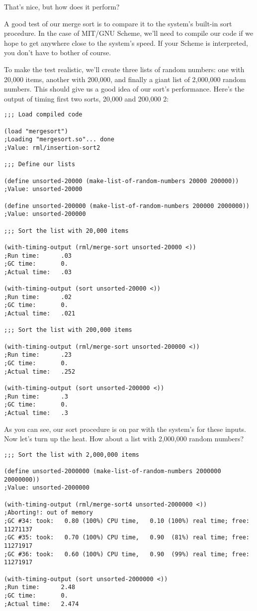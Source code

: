 \documentclass[12pt,openright,draft]{book}
\begin{document}
That's nice, but how does it perform?

A good test of our merge sort is to compare it to the system's
built-in sort procedure. In the case of MIT/GNU Scheme, we'll need to
compile our code if we hope to get anywhere close to the system's
speed. If your Scheme is interpreted, you don't have to bother of
course.

To make the test realistic, we'll create three lists of random
numbers: one with 20,000 items, another with 200,000, and finally a
giant list of 2,000,000 random numbers. This should give us a good
idea of our sort's performance. Here's the output of timing first two
sorts, 20,000 and 200,000 2:

\begin{verbatim}
;;; Load compiled code

(load "mergesort")
;Loading "mergesort.so"... done
;Value: rml/insertion-sort2

;;; Define our lists

(define unsorted-20000 (make-list-of-random-numbers 20000 200000))
;Value: unsorted-20000

(define unsorted-200000 (make-list-of-random-numbers 200000 2000000))
;Value: unsorted-200000

;;; Sort the list with 20,000 items

(with-timing-output (rml/merge-sort unsorted-20000 <))
;Run time:      .03
;GC time:       0.
;Actual time:   .03

(with-timing-output (sort unsorted-20000 <))
;Run time:      .02
;GC time:       0.
;Actual time:   .021

;;; Sort the list with 200,000 items

(with-timing-output (rml/merge-sort unsorted-200000 <))
;Run time:      .23
;GC time:       0.
;Actual time:   .252

(with-timing-output (sort unsorted-200000 <))
;Run time:      .3
;GC time:       0.
;Actual time:   .3
\end{verbatim}

As you can see, our sort procedure is on par with the system's for
these inputs. Now let's turn up the heat. How about a list with
2,000,000 random numbers?

\begin{verbatim}
;;; Sort the list with 2,000,000 items

(define unsorted-2000000 (make-list-of-random-numbers 2000000 20000000))
;Value: unsorted-2000000

(with-timing-output (rml/merge-sort4 unsorted-2000000 <))
;Aborting!: out of memory
;GC #34: took:   0.80 (100%) CPU time,   0.10 (100%) real time; free: 11271137
;GC #35: took:   0.70 (100%) CPU time,   0.90  (81%) real time; free: 11271917
;GC #36: took:   0.60 (100%) CPU time,   0.90  (99%) real time; free: 11271917

(with-timing-output (sort unsorted-2000000 <))
;Run time:      2.48
;GC time:       0.
;Actual time:   2.474

\end{verbatim}
\end{document}

